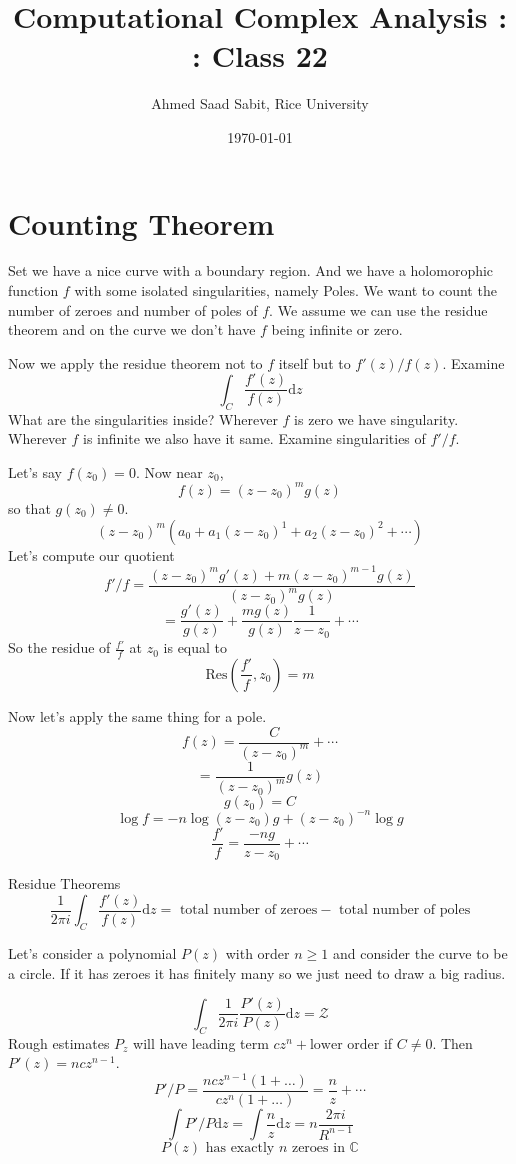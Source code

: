 \documentclass[letter]{article}
\title{Computational Complex Analysis : : Class 22}
\author{Ahmed Saad Sabit, Rice University}
\date{\today}
\begin{document}
\maketitle
\section*{Counting Theorem}

Set we have a nice curve with a boundary region. And we have a holomorophic function $f $ with some isolated singularities, namely Poles. We want to count the number of zeroes and number of poles of $f$. We assume we can use the residue theorem and on the curve we don't have $f$ being infinite or zero. 

Now we apply the residue theorem not to $f$ itself but to $f'(z) / f(z)$. Examine 
\[
\int_C \frac{f'(z)}{f(z)} \mathrm{d} z
\] 
What are the singularities inside? Wherever $f$ is zero we have singularity. Wherever $f$ is infinite we also have it same. Examine singularities of $f'/f$.

Let's say $f(z_0) = 0$. Now near $z_0$, 
\[
f(z) = (z-z_0)^{m} g(z)
\] 
so that $g(z_0) \neq  0$. 
\[
	(z-z_0)^{m} \left(
a_0 + a_1 (z-z_0)^{1} + a_2 (z-z_0)^{2} + \cdots
	\right)
\]
Let's compute our quotient 
\[
f'/f = \frac{(z-z_0)^{m} g'(z) + m (z-z_0)^{m-1} g(z)}{(z-z_0)^{m} g(z)}
\]
\[
 = \frac{g'(z)}{g(z)} + \frac{m g(z)}{g(z)} \frac{1}{z-z_0} + \cdots
\] 
So the residue of $\frac{f'}{f}$ at $z_0$ is equal to 
\[ 
	\text{Res} \left(\frac{f'}{f} , z_0\right) = m
\]

Now let's apply the same thing for a pole. 
\[
f(z) = \frac{C}{(z-z_0)^{m}} + \cdots
\]
\[
= \frac{1}{(z-z_0)^{m} } g(z) 
\]
\[
g(z_0) = C
\] 
\[
\log f = -n \log(z-z_0)g + (z-z_0)^{-n} \log g
\] 
\[
\frac{f'}{f} = \frac{-ng }{z-z_0} + \cdots
\]

Residue Theorems 
\[
\frac{1}{2 \pi i } \int_C \frac{f'(z)}{f(z)} \mathrm{d} z = \text{ total number of zeroes} - \text{ total number of poles}
\]

Let's consider a polynomial $P(z)$ with order $n\ge 1$ and consider the curve to be a circle. If it has zeroes it has finitely many so we just need to draw a big radius. 

\[
\int_C \frac{1}{2 \pi i } \frac{P'(z)}{P(z)} \mathrm{d} z = \mathcal Z
\] 
Rough estimates $P_z$ will have leading term $cz^{n} + \text{lower order}$ if $C \neq  0$. Then $P'(z) = nc z^{ n-1}$. 
\[
P'/P = \frac{ncz^{n-1} (1+\ldots)}{ cz^{n} (1+\ldots)} = \frac{n}{z} + \cdots 
\]
\[
\int P' / P \mathrm{d} z = \int \frac{n}{z} \mathrm{d} z = n \frac{2 \pi i }{R^{n-1}}
\] 
\[
P(z) \text{ has exactly } n \text{ zeroes in } \mathbb{C}
\]
\end{document}

